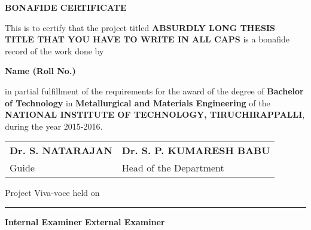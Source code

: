 \thispagestyle{plain}
\begin{center}
\textbf{BONAFIDE CERTIFICATE}
\end{center}

\vspace{0.3cm}
\fontsize{12pt}{18pt}\selectfont This is to certify that the project titled \textbf{ABSURDLY LONG THESIS TITLE THAT YOU HAVE TO WRITE IN ALL CAPS} is a bonafide record of the work done by
\vspace{0.3cm}

\begin{center}
\textbf{Name (Roll No.)}
\end{center}

\vspace{0.3cm}
\noindent
\fontsize{12pt}{18pt}\selectfont in partial fulfillment of the requirements for the award of the degree of \textbf{Bachelor of Technology} in \textbf{Metallurgical and Materials Engineering} of the \textbf{NATIONAL INSTITUTE OF TECHNOLOGY, TIRUCHIRAPPALLI}, during the year 2015-2016.

\vspace{3cm}

\begin{tabu} to \textwidth { X[l] X[c] }

 \textbf{Dr. S. NATARAJAN} & \textbf{Dr. S. P. KUMARESH BABU} \\ \hspace{1cm} Guide & Head of the Department

\end{tabu}

\vspace{4cm}
Project Viva-voce held on \rule{5.5cm}{.1pt}

\vspace{4cm}
\textbf{Internal Examiner} \hfill \textbf{External Examiner}

\newpage
